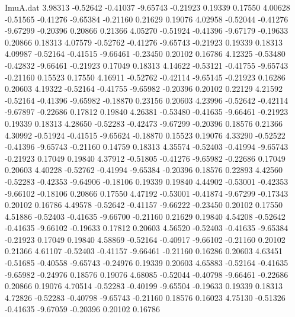 \begin{filecontents}{ImuA.dat}
   3.98313   -0.52642   -0.41037   -9.65743   -0.21923    0.19339    0.17550
   4.00628   -0.51565   -0.41276   -9.65384   -0.21160    0.21629    0.19076
   4.02958   -0.52044   -0.41276   -9.67299   -0.20396    0.20866    0.21366
   4.05270   -0.51924   -0.41396   -9.67179   -0.19633    0.20866    0.18313
   4.07579   -0.52762   -0.41276   -9.65743   -0.21923    0.19339    0.18313
   4.09987   -0.52164   -0.41515   -9.66461   -0.23450    0.20102    0.16786
   4.12325   -0.53480   -0.42832   -9.66461   -0.21923    0.17049    0.18313
   4.14622   -0.53121   -0.41755   -9.65743   -0.21160    0.15523    0.17550
   4.16911   -0.52762   -0.42114   -9.65145   -0.21923    0.16286    0.20603
   4.19322   -0.52164   -0.41755   -9.65982   -0.20396    0.20102    0.22129
   4.21592   -0.52164   -0.41396   -9.65982   -0.18870    0.23156    0.20603
   4.23996   -0.52642   -0.42114   -9.67897   -0.22686    0.17812    0.19840
   4.26381   -0.53480   -0.41635   -9.66461   -0.21923    0.19339    0.18313
   4.28650   -0.52283   -0.42473   -9.67299   -0.20396    0.18576    0.21366
   4.30992   -0.51924   -0.41515   -9.65624   -0.18870    0.15523    0.19076
   4.33290   -0.52522   -0.41396   -9.65743   -0.21160    0.14759    0.18313
   4.35574   -0.52403   -0.41994   -9.65743   -0.21923    0.17049    0.19840
   4.37912   -0.51805   -0.41276   -9.65982   -0.22686    0.17049    0.20603
   4.40228   -0.52762   -0.41994   -9.65384   -0.20396    0.18576    0.22893
   4.42560   -0.52283   -0.42353   -9.64906   -0.18106    0.19339    0.19840
   4.44902   -0.53001   -0.42353   -9.66102   -0.18106    0.20866    0.17550
   4.47192   -0.53001   -0.41874   -9.67299   -0.17343    0.20102    0.16786
   4.49578   -0.52642   -0.41157   -9.66222   -0.23450    0.20102    0.17550
   4.51886   -0.52403   -0.41635   -9.66700   -0.21160    0.21629    0.19840
   4.54208   -0.52642   -0.41635   -9.66102   -0.19633    0.17812    0.20603
   4.56520   -0.52403   -0.41635   -9.65384   -0.21923    0.17049    0.19840
   4.58869   -0.52164   -0.40917   -9.66102   -0.21160    0.20102    0.21366
   4.61107   -0.52403   -0.41157   -9.66461   -0.21160    0.16286    0.20603
   4.63451   -0.51685   -0.40558   -9.65743   -0.24976    0.19339    0.20603
   4.65883   -0.52164   -0.41635   -9.65982   -0.24976    0.18576    0.19076
   4.68085   -0.52044   -0.40798   -9.66461   -0.22686    0.20866    0.19076
   4.70514   -0.52283   -0.40199   -9.65504   -0.19633    0.19339    0.18313
   4.72826   -0.52283   -0.40798   -9.65743   -0.21160    0.18576    0.16023
   4.75130   -0.51326   -0.41635   -9.67059   -0.20396    0.20102    0.16786

\end{filecontents}
